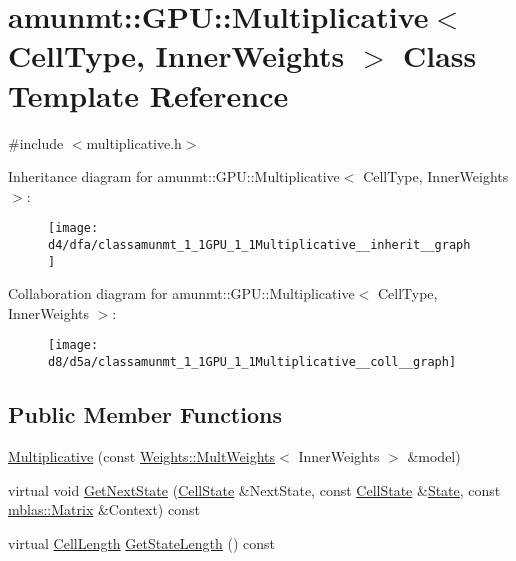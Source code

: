 \hypertarget{classamunmt_1_1GPU_1_1Multiplicative}{}\section{amunmt\+:\+:G\+PU\+:\+:Multiplicative$<$ Cell\+Type, Inner\+Weights $>$ Class Template Reference}
\label{classamunmt_1_1GPU_1_1Multiplicative}


{\ttfamily \#include $<$multiplicative.\+h$>$}



Inheritance diagram for amunmt\+:\+:G\+PU\+:\+:Multiplicative$<$ Cell\+Type, Inner\+Weights $>$\+:
\nopagebreak
\begin{figure}[H]
\begin{center}
\leavevmode
\texttt{[image: d4/dfa/classamunmt\_1\_1GPU\_1\_1Multiplicative\_\_inherit\_\_graph]}
\end{center}
\end{figure}


Collaboration diagram for amunmt\+:\+:G\+PU\+:\+:Multiplicative$<$ Cell\+Type, Inner\+Weights $>$\+:
\nopagebreak
\begin{figure}[H]
\begin{center}
\leavevmode
\texttt{[image: d8/d5a/classamunmt\_1\_1GPU\_1\_1Multiplicative\_\_coll\_\_graph]}
\end{center}
\end{figure}
\subsection*{Public Member Functions}
\begin{DoxyCompactItemize}
\item 
\hyperlink{classamunmt_1_1GPU_1_1Multiplicative_a33fc8271a8fe73ce73216c5748ee1cc4}{Multiplicative} (const \hyperlink{structamunmt_1_1GPU_1_1Weights_1_1MultWeights}{Weights\+::\+Mult\+Weights}$<$ Inner\+Weights $>$ \&model)
\item 
virtual void \hyperlink{classamunmt_1_1GPU_1_1Multiplicative_a1f485aad0d4da73469d58f61fc121341}{Get\+Next\+State} (\hyperlink{structamunmt_1_1GPU_1_1CellState}{Cell\+State} \&Next\+State, const \hyperlink{structamunmt_1_1GPU_1_1CellState}{Cell\+State} \&\hyperlink{classamunmt_1_1State}{State}, const \hyperlink{namespaceamunmt_1_1GPU_1_1mblas_ab67821a8254de53e45a623cf73c0aef6}{mblas\+::\+Matrix} \&Context) const 
\item 
virtual \hyperlink{structamunmt_1_1GPU_1_1CellLength}{Cell\+Length} \hyperlink{classamunmt_1_1GPU_1_1Multiplicative_a5be06555bcb9b8415ae9558109aa2699}{Get\+State\+Length} () const 
\end{DoxyCompactItemize}

